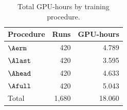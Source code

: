 \begin{table}[H]
  \centering
  \caption{Total GPU-hours by training procedure.}
  \label{tab:additional-training-gpu-hours}
  \begin{tabular}{@{}lrr@{}}
    \toprule
    Procedure & Runs & GPU-hours \\
    \midrule
    \(\Aerm\)  & 420 & 4.789 \\
    \(\Alast\) & 420 & 3.595 \\
    \(\Ahead\) & 420 & 4.633 \\
    \(\Afull\) & 420 & 5.043 \\
    \midrule
    Total      & 1,680 & 18.060 \\
    \bottomrule
  \end{tabular}
\end{table}
